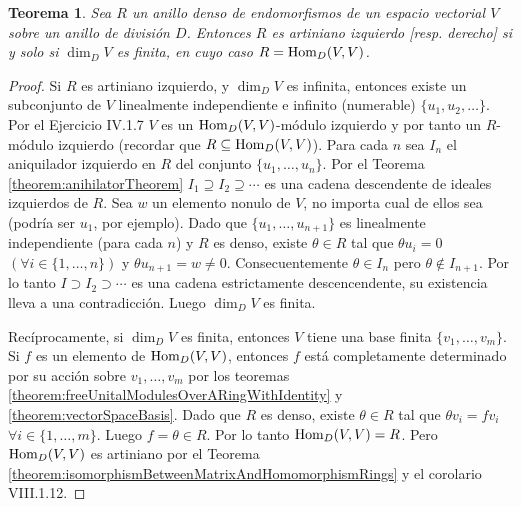 \documentclass{report}
\newcommand{\Hom}{\textnormal{Hom}}
\newtheorem{theorem}{Teorema}
\begin{document}
  \begin{theorem}
    \label{theorem:leftArtinianDenseEndomorphismRingsOfVectorSpaces}
    Sea \(R\) un anillo denso de endomorfismos de un espacio vectorial \(V\) sobre un anillo de división \(D\).
    Entonces \(R\) es artiniano izquierdo [resp. derecho] si y solo si \(\dim_D V\) es finita, en cuyo caso \(R = \Hom_D(V, V)\).
  \end{theorem}
  \begin{proof}
    Si \(R\) es artiniano izquierdo, y \(\dim_D V\) es infinita, entonces existe un subconjunto de \(V\) linealmente independiente e infinito (numerable) \(\{u_1, u_2, \dots\}\).
    Por el Ejercicio IV.1.7 \(V\) es un \(\Hom_D(V, V)\)-módulo izquierdo y por tanto un \(R\)-módulo izquierdo (recordar que \(R \subseteq \Hom_D(V, V)\)).
    Para cada \(n\) sea \(I_n\) el aniquilador izquierdo en \(R\) del conjunto \(\{u_1, \dots, u_n\}\).
    Por el Teorema \ref{theorem:anihilatorTheorem} \(I_1 \supseteq I_2 \supseteq \cdots\) es una cadena descendente de ideales izquierdos de \(R\).
    Sea \(w\) un elemento nonulo de \(V\), no importa cual de ellos sea (podría ser \(u_1\), por ejemplo).
    Dado que \(\{u_1, \dots, u_{n + 1}\}\) es linealmente independiente (para cada \(n\)) y \(R\) es denso, existe \(\theta \in R\) tal que \(\theta u_i = 0\) \((\forall i \in \{1, \dots, n\})\) y \(\theta u_{n + 1} = w \neq 0\).
    Consecuentemente \(\theta \in I_n\) pero \(\theta \notin I_{n + 1}\).
    Por lo tanto \(I \supset I_2 \supset \cdots\) es una cadena estrictamente descencendente, su existencia lleva a una contradicción.
    Luego \(\dim_D V\) es finita.

    Recíprocamente, si \(\dim_D V\) es finita, entonces \(V\) tiene una base finita \(\{v_1, \dots, v_m\}\).
    Si \(f\) es un elemento de \(\Hom_D(V, V)\), entonces \(f\) está completamente determinado por su acción sobre \(v_1, \dots, v_m\) por los teoremas \ref{theorem:freeUnitalModulesOverARingWithIdentity} y \ref{theorem:vectorSpaceBasis}.
    Dado que \(R\) es denso, existe \(\theta \in R\) tal que \(\theta v_i = f v_i\) \(\forall i \in \{1, \dots, m\}\).
    Luego \(f = \theta \in R\).
    Por lo tanto \(\Hom_D(V, V) = R\).
    Pero \(\Hom_D(V, V)\) es artiniano por el Teorema \ref{theorem:isomorphismBetweenMatrixAndHomomorphismRings} y el corolario VIII.1.12.
  \end{proof}
\end{document}
